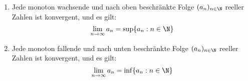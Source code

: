 \begin{enumerate}[label=\alph*)]
    \item Jede monoton wachsende und nach oben beschränkte Folge $(a_n)_{n \in \N}$ reeller Zahlen ist konvergent, und es gilt:
    $$\lim_{n \to \infty} a_n = \sup\{a_n : n \in \N\}$$
    \item Jede monoton fallende und nach unten beschränkte Folge $(a_n)_{n \in \N}$ reeller Zahlen ist konvergent, und es gilt:
    $$\lim_{n \to \infty} a_n = \inf\{a_n : n \in \N\}$$
\end{enumerate}